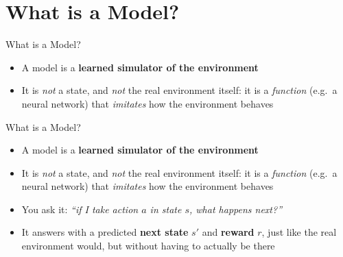 \section{What is a Model?}
\begin{frame}{What is a Model?}
\begin{itemize}
    \item A model is a \textbf{learned simulator of the environment}
    \item It is \emph{not} a state, and \emph{not} the real environment itself:
          it is a \emph{function} (e.g.\ a neural network) that \emph{imitates}
          how the environment behaves
\end{itemize}
\end{frame}

\begin{frame}{What is a Model?}
\begin{itemize}
    \item A model is a \textbf{learned simulator of the environment}
    \item It is \emph{not} a state, and \emph{not} the real environment itself:
          it is a \emph{function} (e.g.\ a neural network) that \emph{imitates}
          how the environment behaves
    \item You ask it: \emph{``if I take action $a$ in state $s$, what happens
          next?''}
    \item It answers with a predicted \textbf{next state} $s'$ and \textbf{reward}
          $r$, just like the real environment would, but without having to
          actually be there
\end{itemize}
\end{frame}


